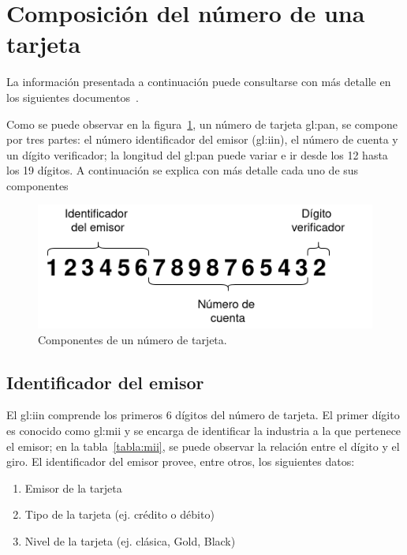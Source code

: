 %
%

\section{Composición del número de una tarjeta}

La información presentada a continuación puede consultarse con más detalle en
los siguientes documentos~\cite{iso_7812, iso_9362, pci_definitive_guide}.

Como se puede observar en la figura~\ref{figura:pan}, un número de tarjeta
\gls{gl:pan}, se compone por tres partes: el número identificador del emisor
(\gls{gl:iin}), el número de cuenta y un dígito verificador; la longitud del
\gls{gl:pan} puede variar e ir desde los 12 hasta los 19 dígitos. A
continuación se explica con más detalle cada uno de sus componentes

\begin{figure}
  \begin{center}
    \includegraphics[width=0.6\linewidth]{diagramas/tarjeta}
    \caption{Componentes de un número de tarjeta.}\label{figura:pan}
   \end{center}
\end{figure}

\subsection{Identificador del emisor}
El \gls{gl:iin} comprende los primeros 6 dígitos del número de
tarjeta. El primer dígito es conocido como \gls{gl:mii} y se encarga de
identificar la industria a la que pertenece el emisor; en la
tabla~\ref{tabla:mii}, se puede observar la relación entre el dígito y el giro.
El identificador del emisor provee, entre otros, los siguientes datos:
\begin{enumerate}
    \item Emisor de la tarjeta
    \item Tipo de la tarjeta (ej. crédito o débito)
    \item Nivel de la tarjeta (ej. clásica, Gold, Black)
\end{enumerate}

